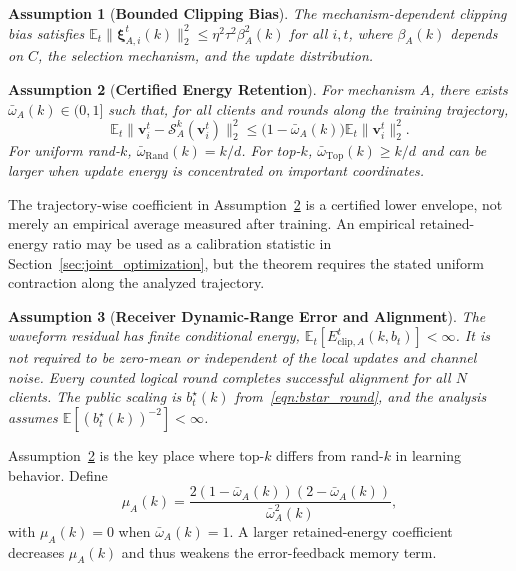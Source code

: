\documentclass[journal]{IEEEtran}
\newenvironment{revisionblock}{\begingroup\color{revisionred}}{\endgroup}
\newtheorem{assumption}{Assumption}
\begin{document}
\begin{revisionblock}
\begin{assumption}[\bf Bounded Clipping Bias]
    \label{assum:clipping}
    The mechanism-dependent clipping bias satisfies $\mathbb{E}_t\|\boldsymbol{\xi}_{A,i}^t(k)\|_2^2\le\eta^2\tau^2\beta_A^2(k)$ for all $i,t$, where $\beta_A(k)$ depends on $C$, the selection mechanism, and the update distribution.
\end{assumption}

\begin{assumption}[\bf Certified Energy Retention]
    \label{assum:retention}
    For mechanism $A$, there exists $\bar{\omega}_A(k)\in(0,1]$ such that, for all clients and rounds along the training trajectory,
    {
\begin{equation}
        \mathbb{E}_t\|\mathbf{v}_i^t-\mathcal{S}_A^k(\mathbf{v}_i^t)\|_2^2
        \le
        \big(1-\bar{\omega}_A(k)\big)\mathbb{E}_t\|\mathbf{v}_i^t\|_2^2.
    \end{equation}
}
    For uniform rand-$k$, $\bar{\omega}_{\mathrm{Rand}}(k)=k/d$. For top-$k$, $\bar{\omega}_{\mathrm{Top}}(k)\ge k/d$ and can be larger when update energy is concentrated on important coordinates.
\end{assumption}

The trajectory-wise coefficient in Assumption~\ref{assum:retention} is a certified lower envelope, not merely an empirical average measured after training. An empirical retained-energy ratio may be used as a calibration statistic in Section~\ref{sec:joint_optimization}, but the theorem requires the stated uniform contraction along the analyzed trajectory.

\begin{assumption}[\bf Receiver Dynamic-Range Error and Alignment]
	\label{assum:dr_alignment}
	The waveform residual has finite conditional energy, $\mathbb{E}_t[E_{\mathrm{clip},A}^t(k,b_t)]<\infty$. It is not required to be zero-mean or independent of the local updates and channel noise. Every counted logical round completes successful alignment for all $N$ clients. The public scaling is $b_t^\star(k)$ from~\eqref{eqn:bstar_round}, and the analysis assumes $\mathbb E[(b_t^\star(k))^{-2}]<\infty$.
\end{assumption}

Assumption~\ref{assum:retention} is the key place where top-$k$ differs from rand-$k$ in learning behavior. Define
{
\begin{equation}
    \mu_A(k)=
    \frac{2(1-\bar{\omega}_A(k))(2-\bar{\omega}_A(k))}
    {\bar{\omega}_A^2(k)},
    \label{eqn:muA}
\end{equation}
}
with $\mu_A(k)=0$ when $\bar{\omega}_A(k)=1$. A larger retained-energy coefficient decreases $\mu_A(k)$ and thus weakens the error-feedback memory term.


\end{revisionblock}
\end{document}
